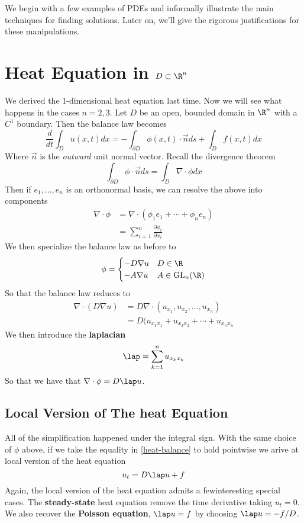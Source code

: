 \documentclass{bkcnotes}
\begin{document}
\maketitle

We begin with a few examples of PDEs and informally illustrate the
main techniques for finding solutions. Later on, we'll give the
rigorous justifications for these manipulations. 

\section{Heat Equation in $D \subset \R^n$}
We derived the 1-dimensional heat equation last time. Now we will see
what happens in the cases $n=2,3$. Let $D$ be an open, bounded domain
in $\R^n$ with a $C^1$ boundary. Then the balance law becomes
\begin{equation}
  \label{eq:heat-balance}
  \frac{d}{dt}\int_{D} u(x,t)dx =
  -\int_{\partial D} \phi(x,t) \cdot \vec{n}ds + \int_{D}f(x,t)dx
\end{equation}
Where $\vec{n}$ is the \textit{outward} unit normal vector. Recall the
divergence theorem
\[
\int_{\partial D} \phi \cdot \vec{n}ds =
\int_{D} \nabla \cdot \phi dx
\]
Then if $e_1,\ldots,e_n$ is an orthonormal basis, we can resolve the
above into components
\begin{align*}
  \nabla \cdot \phi &= \nabla \cdot (\phi_1e_1 + \cdots + \phi_ne_n) \\
  &= \sum_{i=1}^n \frac{\partial \phi_i}{\partial x_i}
\end{align*}
We then specialize the balance law as before to
\[
\phi =
\begin{cases}
  -D\nabla u & D \in \R \\
  -A\nabla u & A \in \text{GL}_n(\R)
\end{cases}
\]
So that the balance law reduces to
\begin{align*}
  \nabla \cdot (D\nabla u) &= D \nabla \cdot (u_{x_1},u_{x_2}, \ldots, u_{x_n}) \\
  &= D (u_{x_1x_1} + u_{x_2x_2} + \cdots + u_{x_nx_n}
\end{align*}
We then introduce the \textbf{laplacian}
\[
\lap = \sum_{k=1}^n u_{x_kx_k}
\]
So that we have that $\nabla \cdot \phi = D \lap u$.

\subsection{Local Version of The heat Equation}
All of the simplification happened under the integral sign. With the
same choice of $\phi$ above, if we take the equality in
\ref{heat-balance} to hold pointwise we arive at local version of the
heat equation
\begin{equation}
  \label{eq:heat}
  u_t = D\lap u + f
\end{equation}
Again, the local version of the heat equation admits a fewinteresting
special cases. The \textbf{steady-state} heat equation remove the time
derivative taking $u_t = 0$. We also recover the \textbf{Poisson
  equation}, $\lap u = f$ by choosing $\lap u = -f / D$.
\end{document}
